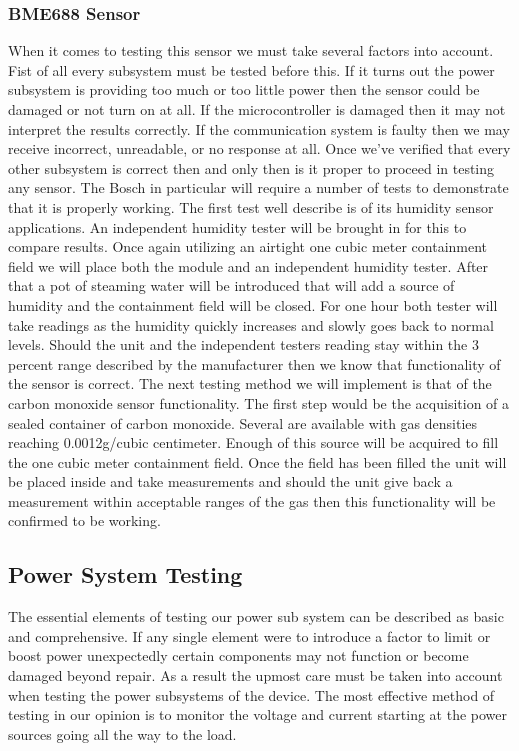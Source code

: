 \subsubsection{BME688 Sensor}
When it comes to testing this sensor we must take several factors into account. Fist of all every subsystem must be tested before this. If it turns out the power subsystem is providing too much or too little power then the sensor could be damaged or not turn on at all. If the microcontroller is damaged then it may not interpret the results correctly. If the communication system is faulty then we may receive incorrect, unreadable, or no response at all. Once we've verified that every other subsystem is correct then and only then is it proper to proceed in testing any sensor.
The Bosch in particular will require a number of tests to demonstrate that it is properly working. The first test well describe is of its humidity sensor applications. An independent humidity tester will be brought in for this to compare results. Once again utilizing an airtight one cubic meter containment field we will place both the module and an independent humidity tester. After that a pot of steaming water will be introduced that will add a source of humidity and the containment field will be closed. For one hour both tester will take readings as the humidity quickly increases and slowly goes back to normal levels. Should the unit and the independent testers reading stay within the 3 percent range described by the manufacturer then we know that functionality of the sensor is correct.
The next testing method we will implement is that of the carbon monoxide sensor functionality. The first step would be the acquisition of a sealed container of carbon monoxide. Several are available with gas densities reaching 0.0012g/cubic centimeter. Enough of this source will be acquired to fill the one cubic meter containment field. Once the field has been filled the unit will be placed inside and take measurements and should the unit give back a measurement within acceptable ranges of the gas then this functionality will be confirmed to be working.

\subsection{Power System Testing}
The essential elements of testing our power sub system can be described as basic and comprehensive. If any single element were to introduce a factor to limit or boost power unexpectedly certain components may not function or become damaged beyond repair. As a result the upmost care must be taken into account when testing the power subsystems of the device. The most effective method of testing in our opinion is to monitor the voltage and current starting at the power sources going all the way to the load. 

